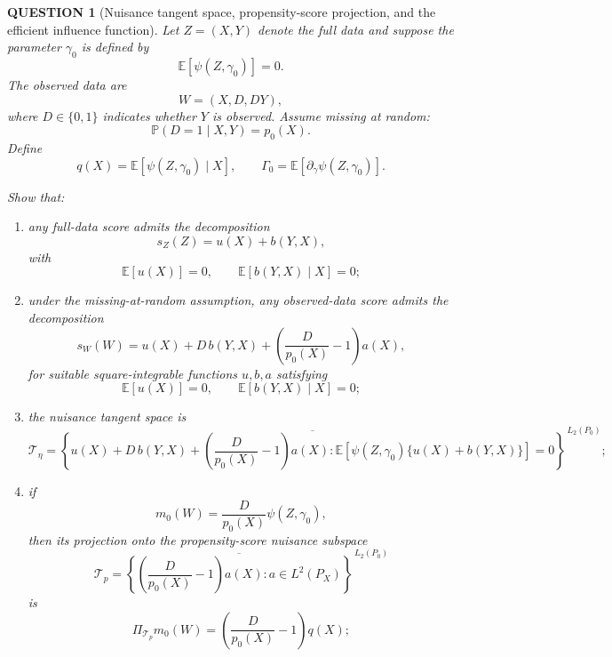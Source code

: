\documentclass[12pt]{article}
\renewcommand{\(}{\left(}%
\renewcommand{\)}{\right)}%
\renewcommand{\[}{\left[}%
\renewcommand{\]}{\right]}%
\newtheorem{question}{QUESTION}[section]}
\begin{document}
\begin{question}[Nuisance tangent space, propensity-score projection, and the efficient influence function]
Let $Z=(X,Y)$ denote the full data and suppose the parameter $\gamma_0$ is defined by
\begin{equation*}
\mathbb{E}[\psi(Z,\gamma_0)]=0.
\end{equation*}
The observed data are
\begin{equation*}
W=(X,D,DY),
\end{equation*}
where $D\in\{0,1\}$ indicates whether $Y$ is observed. Assume missing at random:
\begin{equation*}
\mathbb{P}(D=1\mid X,Y)=p_0(X).
\end{equation*}
Define
\begin{equation*}
q(X)=\mathbb{E}[\psi(Z,\gamma_0)\mid X],
\qquad
\Gamma_0=\mathbb{E}\!\left[\partial_\gamma \psi(Z,\gamma_0)\right].
\end{equation*}

Show that:

\begin{enumerate}
\item any full-data score admits the decomposition
\begin{equation*}
s_Z(Z)=u(X)+b(Y,X),
\end{equation*}
with
\begin{equation*}
\mathbb{E}[u(X)]=0,
\qquad
\mathbb{E}[b(Y,X)\mid X]=0;
\end{equation*}

\item under the missing-at-random assumption, any observed-data score admits the decomposition
\begin{equation*}
s_W(W)=u(X)+D\,b(Y,X)+\left(\frac{D}{p_0(X)}-1\right)a(X),
\end{equation*}
for suitable square-integrable functions $u,b,a$ satisfying
\begin{equation*}
\mathbb{E}[u(X)]=0,
\qquad
\mathbb{E}[b(Y,X)\mid X]=0;
\end{equation*}

\item the nuisance tangent space is
\begin{equation*}
\mathcal{T}_{\eta}
=
\overline{
\left\{
u(X)+D\,b(Y,X)+\left(\frac{D}{p_0(X)}-1\right)a(X):
\mathbb{E}\!\left[\psi(Z,\gamma_0)\{u(X)+b(Y,X)\}\right]=0
\right\}
}^{\,L_2(P_0)};
\end{equation*}

\item if 
\begin{equation*}
m_0(W)=\frac{D}{p_0(X)}\psi(Z,\gamma_0),
\end{equation*}
then its projection onto the propensity-score nuisance subspace
\begin{equation*}
\mathcal{T}_{p}
=
\overline{
\left\{
\left(\frac{D}{p_0(X)}-1\right)a(X): a \in L^2(P_X)
\right\}
}^{\,L_2(P_0)}
\end{equation*}
is
\begin{equation*}
\Pi_{\mathcal{T}_{p}} m_0(W)
=
\left(\frac{D}{p_0(X)}-1\right)q(X);
\end{equation*}


\end{enumerate}
\end{question}
\end{document}
